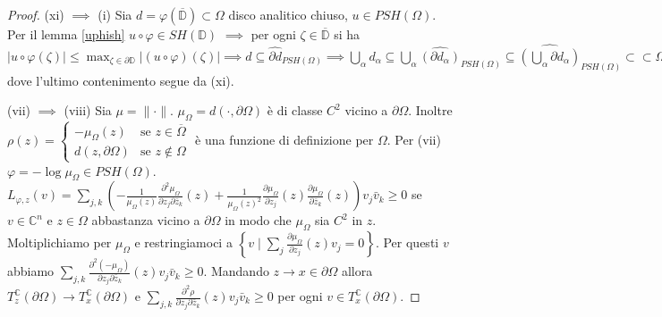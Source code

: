\begin{proof}
  (xi) $\implies$ (i) Sia $d=\varphi(\overline{\mathbb{D}}) \subset \Omega$ disco analitico chiuso, $u \in PSH(\Omega)$.
  Per il lemma \ref{uphish} $u\circ\varphi \in SH(\mathbb{D})$ $\implies$ per ogni $\zeta \in \overline{\mathbb{D}}$ si ha $\displaystyle |u\circ\varphi(\zeta)| \le \max_{\zeta \in \partial\mathbb{D}}|(u\circ\varphi)(\zeta)| \implies d \subseteq \widehat{\partial d}_{PSH(\Omega)} \implies \bigcup_{\alpha} d_{\alpha} \subseteq \bigcup_{\alpha} \widehat{(\partial d_{\alpha})}_{PSH(\Omega)} \subseteq \widehat{\left(\bigcup_{\alpha} \partial d_{\alpha}\right)}_{PSH(\Omega)} \subset\subset \Omega$ dove l'ultimo contenimento segue da (xi).

  (vii) $\implies$ (viii) Sia $\mu=\|\cdot\|$. $\mu_{\Omega}=d(\cdot,\partial\Omega)$ è di classe $C^2$ vicino a $\partial\Omega$. Inoltre $\rho(z)=\begin{cases}
    -\mu_{\Omega}(z) & \mbox{se }z \in \overline{\Omega} \\
    d(z,\partial\Omega) & \mbox{se } z \not\in \Omega
  \end{cases}$ è una funzione di definizione per $\Omega$. Per (vii) $\varphi=-\log{\mu_{\Omega}} \in PSH(\Omega)$.
  $\displaystyle L_{\varphi,z}(v)=\sum_{j,k} \left(-\frac{1}{\mu_{\Omega}(z)}\frac{\partial^2 \mu_{\Omega}}{\partial z_j\partial\bar{z}_k}(z)+\frac{1}{\mu_{\Omega}(z)^2}\frac{\partial\mu_{\Omega}}{\partial z_j}(z)\frac{\partial\mu_{\Omega}}{\partial\bar{z}_k}(z)\right)v_j\bar{v}_k \ge 0$ se $v \in \mathbb{C}^n$ e $z \in \Omega$ abbastanza vicino a $\partial\Omega$ in modo che $\mu_{\Omega}$ sia $C^2$ in $z$.
  Moltiplichiamo per $\mu_{\Omega}$ e restringiamoci a $\displaystyle \left\{v \mid \sum_j \frac{\partial \mu_{\Omega}}{\partial z_j}(z)v_j=0\right\}$. Per questi $v$ abbiamo $\displaystyle \sum_{j,k} \frac{\partial^2(-\mu_{\Omega})}{\partial z_j\partial\bar{z}_k}(z)v_j\bar{v}_k \ge 0$.
  Mandando $z \longrightarrow x \in \partial\Omega$ allora $T_z^{\mathbb{C}}(\partial\Omega) \longrightarrow T_x^{\mathbb{C}}(\partial\Omega)$ e $\displaystyle \sum_{j,k} \frac{\partial^2\rho}{\partial z_j\partial\bar{z}_k}(z)v_j\bar{v}_k \ge 0$ per ogni $v \in T_x^{\mathbb{C}}(\partial\Omega)$.


\end{proof}

